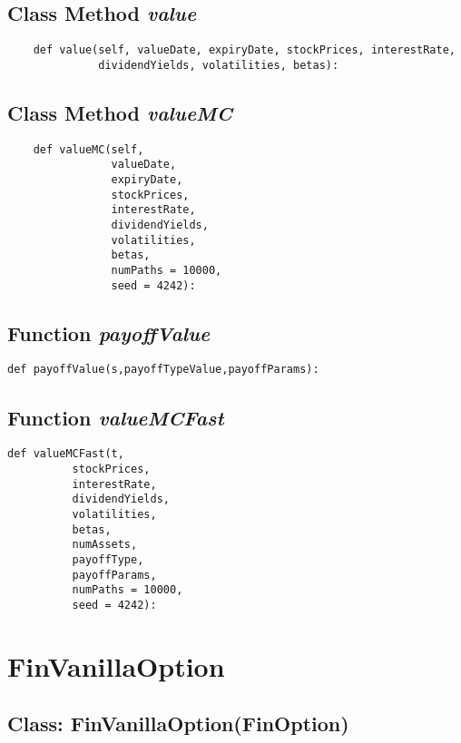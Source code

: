 \documentclass[twoside,11pt]{book}
\begin{document}
\subsection{Class Method {\it value}}


\begin{lstlisting}
    def value(self, valueDate, expiryDate, stockPrices, interestRate,
              dividendYields, volatilities, betas):
\end{lstlisting}

\subsection{Class Method {\it valueMC}}


\begin{lstlisting}
    def valueMC(self, 
                valueDate,
                expiryDate,
                stockPrices,
                interestRate,
                dividendYields,
                volatilities,
                betas,
                numPaths = 10000,
                seed = 4242):
\end{lstlisting}

\subsection{Function {\it payoffValue}}


\begin{lstlisting}
def payoffValue(s,payoffTypeValue,payoffParams):
\end{lstlisting}

\subsection{Function {\it valueMCFast}}


\begin{lstlisting}
def valueMCFast(t,
          stockPrices,
          interestRate,
          dividendYields,
          volatilities,
          betas,
          numAssets,
          payoffType,
          payoffParams,
          numPaths = 10000,
          seed = 4242):
\end{lstlisting}

\newpage
\section{FinVanillaOption}

\subsection{Class: FinVanillaOption(FinOption)}
\end{document}
